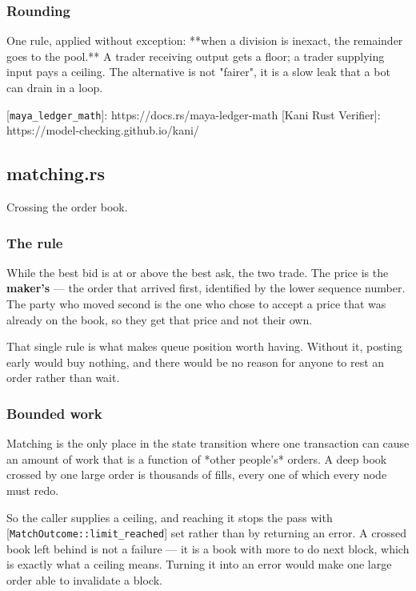 \documentclass[11pt,a4paper]{article}
\begin{document}
\subsubsection{Rounding}

One rule, applied without exception: **when a division is inexact, the
remainder goes to the pool.** A trader receiving output gets a floor; a
trader supplying input pays a ceiling. The alternative is not "fairer", it
is a slow leak that a bot can drain in a loop.

[\texttt{maya\_ledger\_math}]: https://docs.rs/maya-ledger-math
[Kani Rust Verifier]: https://model-checking.github.io/kani/

\subsection{matching.rs}
Crossing the order book.

\subsubsection{The rule}

While the best bid is at or above the best ask, the two trade. The price is
the \textbf{maker's} — the order that arrived first, identified by the lower
sequence number. The party who moved second is the one who chose to accept a
price that was already on the book, so they get that price and not their
own.

That single rule is what makes queue position worth having. Without it,
posting early would buy nothing, and there would be no reason for anyone to
rest an order rather than wait.

\subsubsection{Bounded work}

Matching is the only place in the state transition where one transaction can
cause an amount of work that is a function of *other people's* orders. A
deep book crossed by one large order is thousands of fills, every one of
which every node must redo.

So the caller supplies a ceiling, and reaching it stops the pass with
[\texttt{MatchOutcome::limit\_reached}] set rather than by returning an error. A
crossed book left behind is not a failure — it is a book with more to do
next block, which is exactly what a ceiling means. Turning it into an error
would make one large order able to invalidate a block.
\end{document}
